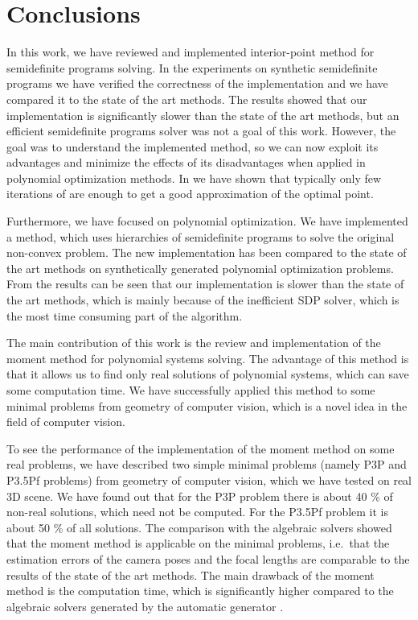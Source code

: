 \chapter{Conclusions}
In this work, we have reviewed and implemented interior-point method for semidefinite programs solving.
In the experiments on synthetic semidefinite programs we have verified the correctness of the implementation and we have compared it to the state of the art methods.
The results showed that our implementation is significantly slower than the state of the art methods, but an efficient semidefinite programs solver was not a goal of this work.
However, the goal was to understand the implemented method, so we can now exploit its advantages and minimize the effects of its disadvantages when applied in polynomial optimization methods.
In  we have shown that typically only few iterations of  are enough to get a good approximation of the optimal point.

Furthermore, we have focused on polynomial optimization.
We have implemented a method, which uses hierarchies of semidefinite programs to solve the original non-convex problem.
The new implementation has been compared to the state of the art methods on synthetically generated polynomial optimization problems.
From the results can be seen that our implementation is slower than the state of the art methods, which is mainly because of the inefficient SDP solver, which is the most time consuming part of the algorithm.

The main contribution of this work is the review and implementation of the moment method for polynomial systems solving.
The advantage of this method is that it allows us to find only real solutions of polynomial systems, which can save some computation time.
We have successfully applied this method to some minimal problems from geometry of computer vision, which is a novel idea in the field of computer vision.

To see the performance of the implementation of the moment method on some real problems, we have described two simple minimal problems (namely P3P and P3.5Pf problems) from geometry of computer vision, which we have tested on real 3D scene.
We have found out that for the P3P problem there is about 40 \% of non-real solutions, which need not be computed.
For the P3.5Pf problem it is about 50 \% of all solutions.
The comparison with the algebraic solvers showed that the moment method is applicable on the minimal problems, i.e.\ that the estimation errors of the camera poses and the focal lengths are comparable to the results of the state of the art methods.
The main drawback of the moment method is the computation time, which is significantly higher compared to the algebraic solvers generated by the automatic generator \cite{autogen}.

